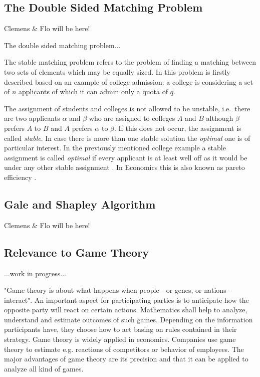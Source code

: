 \subsection{The Double Sided Matching Problem}
Clemens \& Flo will be here!

The double sided matching problem...

The stable matching problem refers to the problem of finding a matching between two sets of elements which may be equally sized. In \cite[p. 9]{gale62a} this problem is firstly described based on an example of college admission: a college is considering a set of $n$ applicants of which it can admin only a quota of $q$.

The assignment of students and colleges is not allowed to be unstable, i.e.\ there are two applicants $\alpha$ and $\beta$ who are assigned to colleges $A$ and $B$ although $\beta$ prefers $A$ to $B$ and $A$ prefers $\alpha$ to $\beta$. If this does not occur, the assignment is called \textit{stable}. In case there is more than one stable solution the \textit{optimal} one is of particular interest. In the previously mentioned college example a stable assignment is called \textit{optimal} if every applicant is at least well off as it would be under any other stable assignment \cite[p. 10]{gale62a}. In Economics this is also known as pareto efficiency \cite[p. 46]{9780199297818}.

\subsection{Gale and Shapley Algorithm}
Clemens \& Flo will be here!

\subsection{Relevance to Game Theory}
...work in progress...

"Game theory is about what happens when people - or genes, or nations - interact". An important aspect for participating parties is to anticipate how the opposite party will react on certain actions. Mathematics shall help to analyze, understand and estimate outcomes of such games. Depending on the information participants have, they choose how to act basing on rules contained in their strategy. Game theory is widely applied in economics. Companies use game theory to estimate e.g. reactions of competitors or behavior of employees. The major advantages of game theory are its precision and that it can be applied to analyze all kind of games. \cite[p. 1ff]{camerer2003behavioral}

